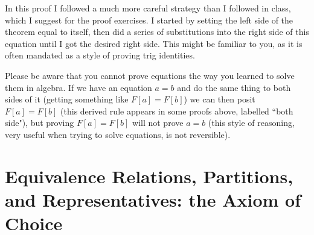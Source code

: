\documentclass[12pt]{book}
\begin{document}
In this proof I followed a much more careful strategy than I followed in class, which I suggest for the proof exercises.  I started by setting the left side of the theorem equal to itself, then
did a series of substitutions into the right side of this equation until I got the desired right side.  This might be familiar to you, as it is often mandated as a style of proving trig identities.

Please be aware that you cannot prove equations the way you learned to solve them in algebra.  If we have an equation $a=b$ and do the same thing to both sides of it
(getting something like $F[a] = F[b]$) we can then posit $F[a] = F[b]$ (this derived rule appears in some proofs above, labelled ``both side"), but proving $F[a] = F[b]$ will not prove $a=b$ (this style of reasoning, very useful when trying to solve equations, is not reversible).

\newpage

\section{Equivalence Relations, Partitions, and Representatives:  the Axiom of Choice}
\end{document}
